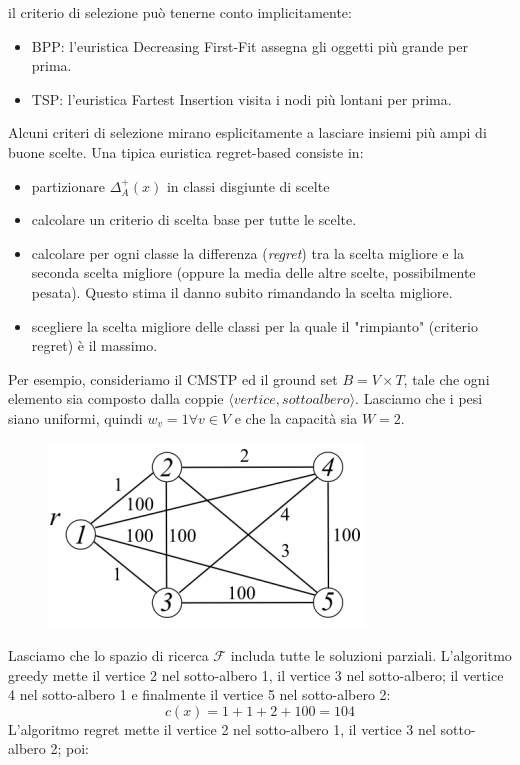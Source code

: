 \documentclass{article}
\begin{document}
il criterio di selezione può tenerne conto implicitamente:
\begin{itemize}
    \item BPP: l'euristica Decreasing First-Fit assegna gli oggetti più grande per prima.
    \item TSP: l'euristica Fartest Insertion visita i nodi più lontani per prima.
\end{itemize}
Alcuni criteri di selezione mirano esplicitamente a lasciare insiemi più ampi di
buone scelte. Una tipica euristica regret-based consiste in:
\begin{itemize}
    \item partizionare $\Delta_A^+(x)$ in classi disgiunte di scelte
    \item calcolare un criterio di scelta base per tutte le scelte.
    \item calcolare per ogni classe la differenza (\textit{regret}) tra la scelta migliore
          e la seconda scelta migliore (oppure la media delle altre scelte, possibilmente pesata).
          Questo stima il danno subito rimandando la scelta migliore.
    \item scegliere la scelta migliore delle classi per la quale il "rimpianto" (criterio regret) è
          il massimo.
\end{itemize}
Per esempio, consideriamo il CMSTP ed il ground set $B=V\times T$, tale che ogni elemento sia composto
dalla coppie $\langle vertice, sottoalbero \rangle$. Lasciamo che i pesi siano uniformi, quindi
$w_v=1 \forall v\in V$ e che la capacità sia $W=2$.

\begin{figure}[H]
    \centering
    \includegraphics[scale=0.7]{images/CMSTP_0.png}
\end{figure}
Lasciamo che lo spazio di ricerca $\mathcal{F}$ includa tutte le soluzioni parziali. L'algoritmo
greedy mette il vertice 2 nel sotto-albero 1, il vertice 3 nel sotto-albero; il vertice 4 nel sotto-albero
1 e finalmente il vertice 5 nel sotto-albero 2:
$$c(x)=1+1+2+100=104$$
L'algoritmo regret mette il vertice 2 nel sotto-albero 1, il vertice 3 nel sotto-albero 2; poi:
\end{document}
